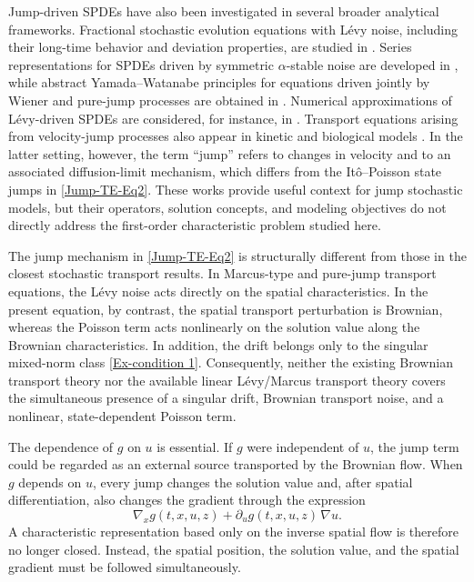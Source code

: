 \documentclass[12pt,oneside, reqno]{amsart}
\numberwithin{equation}{section}
\begin{document}
	Jump-driven SPDEs have also been investigated in several broader	analytical frameworks. Fractional stochastic evolution equations with	L\'evy noise, including their long-time behavior and deviation	properties, are studied in \cite{Xu2024}. Series representations for	SPDEs driven by symmetric \(\alpha\)-stable noise are developed in	\cite{Balan2024}, while abstract Yamada--Watanabe principles for	equations driven jointly by Wiener and pure-jump processes are obtained	in \cite{Fahim2025}. Numerical approximations of L\'evy-driven SPDEs are	considered, for instance, in \cite{Chen2024}. Transport equations	arising from velocity-jump processes also appear in kinetic and	biological models \cite{Othmer2000}. In the latter setting, however, the	term ``jump'' refers to changes in velocity and to an associated	diffusion-limit mechanism, which differs from the It\^o--Poisson state
	jumps in \eqref{Jump-TE-Eq2}. These works provide useful context for	jump stochastic models, but their operators, solution concepts, and	modeling objectives do not directly address the first-order	characteristic problem studied here.
	
	The jump mechanism in \eqref{Jump-TE-Eq2} is structurally different	from those in the closest stochastic transport results. In Marcus-type	and pure-jump transport equations, the L\'evy noise acts directly on the	spatial characteristics. In the present equation, by contrast, the	spatial transport perturbation is Brownian, whereas the Poisson term	acts nonlinearly on the solution value along the Brownian	characteristics. In addition, the drift belongs only to the singular
	mixed-norm class \eqref{Ex-condition 1}. Consequently, neither the	existing Brownian transport theory nor the available linear	L\'evy/Marcus transport theory covers the simultaneous presence of a	singular drift, Brownian transport noise, and a nonlinear,	state-dependent Poisson term.
	
	The dependence of \(g\) on \(u\) is essential. If \(g\) were independent	of \(u\), the jump term could be regarded as an external source	transported by the Brownian flow. When \(g\) depends on \(u\), every jump	changes the solution value and, after spatial differentiation, also	changes the gradient through the expression
	\begin{equation}\label{jump-gradient-structure}
		\nabla_x g(t,x,u,z)
		+
		\partial_u g(t,x,u,z)\,\nabla u.
	\end{equation}
	A characteristic representation based only on the inverse spatial flow	is therefore no longer closed. Instead, the spatial position, the	solution value, and the spatial gradient must be followed	simultaneously.
	
\end{document}
